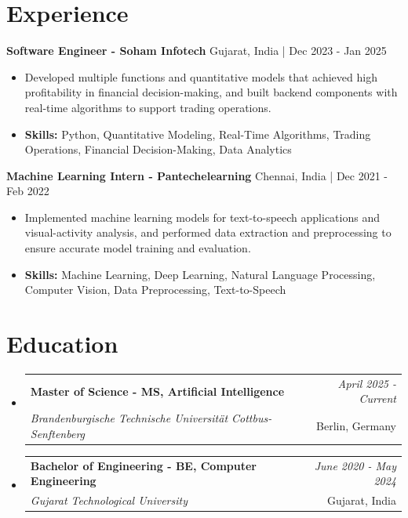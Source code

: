 \documentclass[a4paper,11pt]{article}
\makeatletter
\newcommand{\resumeSubheading}[4]{
\vspace{0.5mm}\item
    \begin{tabular*}{0.98\textwidth}[t]{l@{\extracolsep{\fill}}r}
        \textbf{#1} & \textit{\footnotesize{#4}} \\
        \textit{\footnotesize{#3}} &  \footnotesize{#2}\\
    \end{tabular*}
    \vspace{-2.4mm}
}
\makeatother
\begin{document}
\section{\textbf{Experience}}


\vspace{1mm}
  \textbf{Software Engineer - Soham Infotech} \hfill Gujarat, India | Dec 2023 - Jan 2025
\vspace{-1.5mm} %
\begin{itemize}
  \item Developed multiple functions and quantitative models that achieved high profitability in financial decision-making, and built backend components with real-time algorithms to support trading operations.

\vspace{-2mm}
  \item \textbf{Skills:} Python, Quantitative Modeling, Real-Time Algorithms, Trading Operations, Financial Decision-Making, Data Analytics
\end{itemize}

\vspace{1mm}
  \textbf{Machine Learning Intern - Pantechelearning} \hfill Chennai, India | Dec 2021 - Feb 2022
\vspace{-1.5mm} %
\begin{itemize}
  \item Implemented machine learning models for text-to-speech applications and visual-activity analysis, and performed data extraction and preprocessing to ensure accurate model training and evaluation.
\vspace{-2mm}
  \item \textbf{Skills:} Machine Learning, Deep Learning, Natural Language Processing, Computer Vision, Data Preprocessing, Text-to-Speech
\end{itemize}\section{\textbf{Education}}
\vspace{-0.4mm}

\begin{itemize}
\resumeSubheading
{Master of Science - MS, Artificial Intelligence }{Berlin, Germany}
{Brandenburgische Technische Universität Cottbus-Senftenberg  }{April 2025 - Current}

\vspace{1.0mm} %
\resumeSubheading
{Bachelor of Engineering - BE, Computer Engineering  }{Gujarat, India}
{Gujarat Technological University }{June 2020 - May 2024}

\end{itemize}
\end{document}
